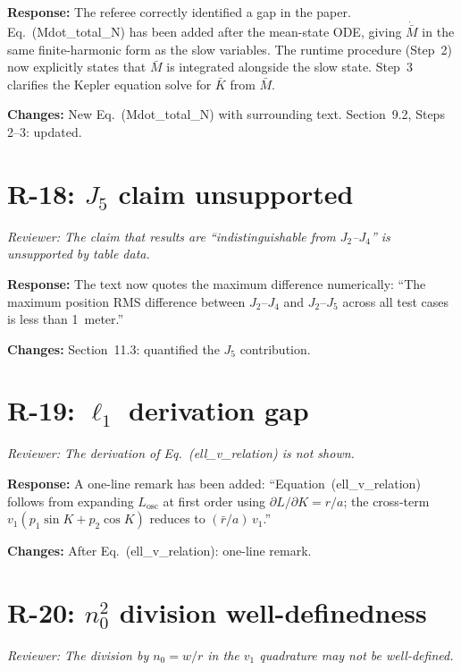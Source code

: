 \documentclass[11pt]{article}
\newcommand{\rev}[1]{\textcolor{revcolor}{\emph{#1}}}
\begin{document}
\textbf{Response:} The referee correctly identified a gap in the paper.
Eq.~(Mdot\_total\_N) has been added after the mean-state ODE, giving
$\dot{\bar M}$ in the same finite-harmonic form as the slow variables.
The runtime procedure (Step~2) now explicitly states that $\bar M$ is
integrated alongside the slow state. Step~3 clarifies the Kepler equation
solve for $\bar K$ from $\bar M$.

\textbf{Changes:} New Eq.~(Mdot\_total\_N) with surrounding text.
Section~9.2, Steps 2--3: updated.

\section*{R-18: $J_5$ claim unsupported}

\rev{Reviewer: The claim that results are ``indistinguishable from
$J_2$--$J_4$'' is unsupported by table data.}

\textbf{Response:} The text now quotes the maximum difference numerically:
``The maximum position RMS difference between $J_2$--$J_4$ and $J_2$--$J_5$
across all test cases is less than 1~meter.''

\textbf{Changes:} Section~11.3: quantified the $J_5$ contribution.

\section*{R-19: $\ell_1$ derivation gap}

\rev{Reviewer: The derivation of Eq.~(ell\_v\_relation) is not shown.}

\textbf{Response:} A one-line remark has been added: ``Equation~(ell\_v\_relation)
follows from expanding $L_{\mathrm{osc}}$ at first order using
$\partial L/\partial K = r/a$; the cross-term
$v_1(p_1\sin K + p_2\cos K)$ reduces to $(\bar r/a)\,v_1$.''

\textbf{Changes:} After Eq.~(ell\_v\_relation): one-line remark.

\section*{R-20: $n_0^2$ division well-definedness}

\rev{Reviewer: The division by $n_0 = w/r$ in the $v_1$ quadrature may
not be well-defined.}
\end{document}

